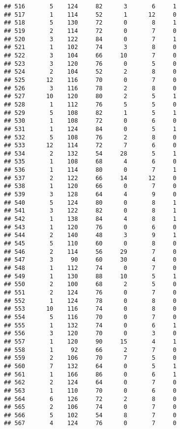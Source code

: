 \documentclass[
]{article}
\begin{document}
\begin{verbatim}
## 516       5    124     82      3       6     1
## 517       1    114     52      1      12     0
## 518       5    130     72      0       8     1
## 519       2    114     72      0       7     0
## 520       3    122     84      0       7     1
## 521       1    102     74      3       8     0
## 522       3    104     66     10       7     0
## 523       3    120     76      0       5     0
## 524       2    104     52      2       8     0
## 525      12    116     70      0       7     0
## 526       3    116     78      2       8     0
## 527      10    120     80      2       5     1
## 528       1    112     76      5       5     0
## 529       5    108     82      1       5     1
## 530       1    108     72      0       6     0
## 531       1    124     84      0       5     1
## 532       5    108     76      2       8     0
## 533      12    114     72      7       6     0
## 534       2    132     54     28       5     1
## 535       1    108     68      4       6     0
## 536       1    114     80      0       7     1
## 537       2    122     66     14      12     0
## 538       1    120     66      0       7     0
## 539       3    128     64      4       9     0
## 540       5    124     80      0       8     1
## 541       3    122     82      0       8     1
## 542       1    138     84      4       8     1
## 543       1    120     76      0       6     0
## 544       2    140     48      3       9     1
## 545       5    110     60      0       8     0
## 546       2    114     56     29       7     0
## 547       3     90     60     30       4     0
## 548       1    112     74      0       7     0
## 549       1    130     88     10       5     1
## 550       2    100     68      2       5     0
## 551       2    124     76      0       7     0
## 552       1    124     78      0       8     0
## 553      10    116     74      0       8     0
## 554       5    116     70      0       7     0
## 555       1    132     74      0       6     1
## 556       3    120     70      0       3     0
## 557       1    120     90     15       4     1
## 558       1     92     66      2       7     0
## 559       2    106     70      7       5     0
## 560       7    132     64      0       5     1
## 561       1    166     86      0       6     1
## 562       2    124     64      0       7     0
## 563       1    110     70      0       6     0
## 564       6    126     72      2       8     0
## 565       2    106     74      0       7     0
## 566       5    102     54      8       7     0
## 567       4    124     76      0       7     0

\end{verbatim}
\end{document}
